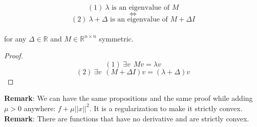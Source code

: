 \vspace{0.5cm}
\begin{property}
$$(1) \ \lambda \text{ is an eigenvalue of } M$$
$$\Leftrightarrow$$
$$(2) \ \lambda + \Delta \text{ is an eigenvalue of } M + \Delta I$$
\\for any $\Delta \in \mathbb{R}$ and $M \in \mathbb{R}^{n \times n}$ symmetric.
\end{property}
\begin{proof}
$$ (1) \ \exists v \: \ M v = \lambda v $$
$$(2) \ \exists v \: \ (M + \Delta I) v = ( \lambda + \Delta)v$$
\end{proof}
\textbf{Remark}: We can have the same propositions and the same proof while adding $\mu > 0$ anywhere: $ f + \mu ||x||^{2}$. It is a regularization to make it strictly convex.\\
\textbf{Remark}: There are functions that have no derivative and are strictly convex.